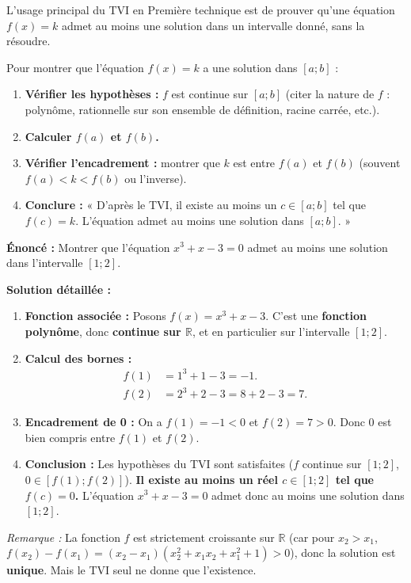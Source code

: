 \documentclass[11pt]{article}
\begin{document}
L'usage principal du TVI en Première technique est de prouver qu'une équation $f(x) = k$ admet au moins une solution dans un intervalle donné, sans la résoudre.

\begin{methode}
Pour montrer que l'équation $f(x) = k$ a une solution dans $[a ; b]$ :
\begin{enumerate}
    \item \textbf{Vérifier les hypothèses :} $f$ est continue sur $[a ; b]$ (citer la nature de $f$ : polynôme, rationnelle sur son ensemble de définition, racine carrée, etc.).
    \item \textbf{Calculer $f(a)$ et $f(b)$.}
    \item \textbf{Vérifier l'encadrement :} montrer que $k$ est entre $f(a)$ et $f(b)$ (souvent $f(a) < k < f(b)$ ou l'inverse).
    \item \textbf{Conclure :} « D'après le TVI, il existe au moins un $c \in [a ; b]$ tel que $f(c) = k$. L'équation admet au moins une solution dans $[a ; b]$. »
\end{enumerate}
\end{methode}

\begin{exoresolu}[Application du TVI : équation $x^3 + x - 3 = 0$]
\textbf{Énoncé :} Montrer que l'équation $x^3 + x - 3 = 0$ admet au moins une solution dans l'intervalle $[1 ; 2]$.

\textbf{Solution détaillée :}
\begin{enumerate}
    \item \textbf{Fonction associée :} Posons $f(x) = x^3 + x - 3$. C'est une \textbf{fonction polynôme}, donc \textbf{continue sur $\mathbb{R}$}, et en particulier sur l'intervalle $[1 ; 2]$.
    \item \textbf{Calcul des bornes :}
    \begin{align*}
        f(1) &= 1^3 + 1 - 3 = -1. \\
        f(2) &= 2^3 + 2 - 3 = 8 + 2 - 3 = 7.
    \end{align*}
    \item \textbf{Encadrement de 0 :} On a $f(1) = -1 < 0$ et $f(2) = 7 > 0$.
    Donc $0$ est bien compris entre $f(1)$ et $f(2)$.
    \item \textbf{Conclusion :} Les hypothèses du TVI sont satisfaites ($f$ continue sur $[1;2]$, $0 \in [f(1); f(2)]$).
    \textbf{Il existe au moins un réel $c \in [1 ; 2]$ tel que $f(c) = 0$.}
    L'équation $x^3 + x - 3 = 0$ admet donc au moins une solution dans $[1 ; 2]$.
\end{enumerate}
\textit{Remarque :} La fonction $f$ est strictement croissante sur $\mathbb{R}$ (car pour $x_2 > x_1$, $f(x_2)-f(x_1) = (x_2-x_1)(x_2^2+x_1x_2+x_1^2+1) > 0$), donc la solution est \textbf{unique}. Mais le TVI seul ne donne que l'existence.
\end{exoresolu}
\end{document}

